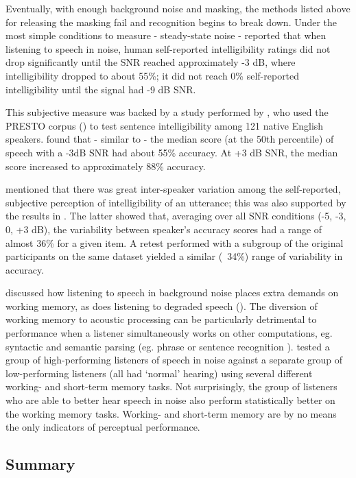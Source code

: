 Eventually, with enough background noise and masking, the methods listed above for releasing the masking fail and recognition begins to break down.  Under the most simple conditions to measure - steady-state noise - \cite{ding:13} reported that when listening to speech in noise, human self-reported intelligibility ratings did not drop significantly until the SNR reached approximately -3 dB, where intelligibility dropped to about 55\%;  it did not reach 0\% self-reported intelligibility until the signal had -9 dB SNR.

This subjective measure was backed by a study performed by \cite{gilbert:13}, who used the PRESTO corpus (\cite{garofolo:93}) to test sentence intelligibility among 121 native English speakers.  \cite{gilbert:13} found that - similar to \cite{ding:13} - the median score (at the 50th percentile) of speech with a -3dB SNR had about 55\% accuracy.  At +3 dB SNR, the median score increased to approximately 88\% accuracy.

\cite{ding:13} mentioned that there was great inter-speaker variation among the self-reported, subjective perception of intelligibility of an utterance; this was also supported by the results in \cite{gilbert:13}. The latter showed that, averaging over all SNR conditions (-5, -3, 0, +3 dB), the variability between speaker's accuracy scores had a range of almost 36\% for a given item.  A retest performed with a subgroup of the original participants on the same dataset yielded a similar (~34\%) range of variability in accuracy.  

\cite{francis:10} discussed how listening to speech in background noise places extra demands on working memory, as does listening to degraded speech (\cite{francis:09}).  The diversion of working memory to acoustic processing can be particularly detrimental to performance when a listener simultaneously works on other computations, eg. syntactic and semantic parsing (eg. phrase or sentence recognition \cite{caplan:99}). \cite{tamati:13} tested a group of high-performing listeners of speech in noise against a separate group of low-performing listeners (all had `normal' hearing) using several different working- and short-term memory tasks.  Not surprisingly, the group of listeners who are able to better hear speech in noise also perform statistically better on the working memory tasks.  Working- and short-term memory are by no means the only indicators of perceptual performance.


\subsection{Summary}

